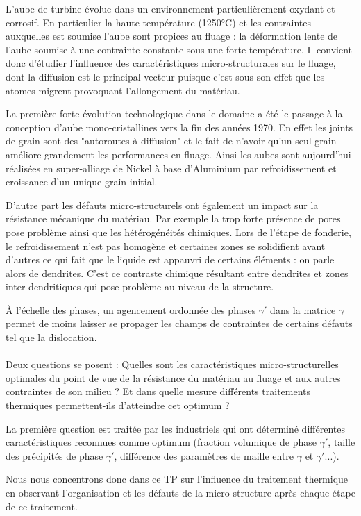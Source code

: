 L'aube de turbine évolue dans un environnement particulièrement oxydant et corrosif. 
En particulier la haute température (1250°C) et les contraintes auxquelles est soumise 
l'aube sont propices au fluage : la déformation lente de l'aube soumise à une contrainte 
constante sous une forte température. Il convient donc d'étudier l'influence des 
caractéristiques micro-structurales sur le fluage, dont la diffusion est le principal 
vecteur puisque c'est sous son effet que les atomes migrent provoquant l'allongement du matériau.


La première forte évolution technologique dans le domaine a été le passage à la conception 
d'aube mono-cristallines vers la fin des années 1970. En effet les joints de grain sont des
"autoroutes à diffusion" et le fait de n'avoir qu'un seul grain améliore grandement les 
performances en fluage. Ainsi les aubes sont aujourd'hui réalisées en super-alliage de 
Nickel à base d'Aluminium par refroidissement et croissance d'un unique grain initial.


D'autre part les défauts micro-structurels ont également un impact sur la résistance 
mécanique du matériau. Par exemple la trop forte présence de pores pose problème 
ainsi que les hétérogénéités chimiques. Lors de l'étape de fonderie, le refroidissement
 n'est pas homogène et certaines zones se solidifient avant d'autres ce qui fait 
 que le liquide est appauvri de certains éléments : on parle alors de dendrites. 
 C'est ce contraste chimique résultant entre dendrites et zones inter-dendritiques
  qui pose problème au niveau de la structure.


À l'échelle des phases, un agencement ordonnée des phases $\gamma'$ dans la 
matrice $\gamma$ permet de moins laisser se propager les champs de contraintes de 
certains défauts tel que la dislocation.
\\
\\

Deux questions se posent : Quelles sont les caractéristiques micro-structurelles 
optimales du point de vue de la résistance du matériau au fluage et aux autres 
contraintes de son milieu ? Et dans quelle mesure différents traitements thermiques 
permettent-ils d'atteindre cet optimum ?


La première question est traitée par les industriels qui ont déterminé différentes 
caractéristiques reconnues comme optimum (fraction volumique de phase $\gamma'$, 
taille des précipités de phase $\gamma'$, différence des paramètres de maille 
entre $\gamma$ et $\gamma'$...).


Nous nous concentrons donc dans ce TP sur l'influence du traitement thermique en observant l'organisation et les défauts de la micro-structure après chaque étape de ce traitement.

\newpage